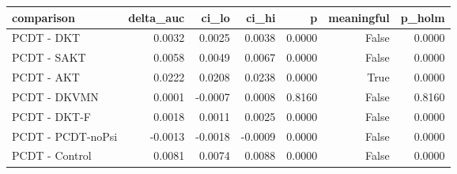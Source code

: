 \begin{tabular}{lrrrrrr}
\toprule
comparison & delta\_auc & ci\_lo & ci\_hi & p & meaningful & p\_holm \\
\midrule
PCDT - DKT & 0.0032 & 0.0025 & 0.0038 & 0.0000 & False & 0.0000 \\
PCDT - SAKT & 0.0058 & 0.0049 & 0.0067 & 0.0000 & False & 0.0000 \\
PCDT - AKT & 0.0222 & 0.0208 & 0.0238 & 0.0000 & True & 0.0000 \\
PCDT - DKVMN & 0.0001 & -0.0007 & 0.0008 & 0.8160 & False & 0.8160 \\
PCDT - DKT-F & 0.0018 & 0.0011 & 0.0025 & 0.0000 & False & 0.0000 \\
PCDT - PCDT-noPsi & -0.0013 & -0.0018 & -0.0009 & 0.0000 & False & 0.0000 \\
PCDT - Control & 0.0081 & 0.0074 & 0.0088 & 0.0000 & False & 0.0000 \\
\bottomrule
\end{tabular}
